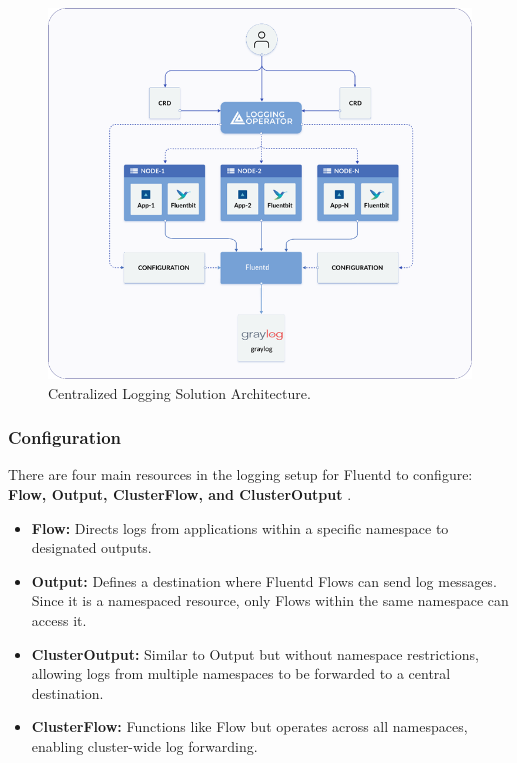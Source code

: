 \documentclass[../main.tex]{subfiles}
\begin{document}
\begin{figure}[H]
        \centering
        \includegraphics[]{img/3-background/centralized_logging/architecture.png}
        \caption{Centralized Logging Solution Architecture. \protect\footnotemark}
        \label{fig:centralized_logging_architecture}
\end{figure}


\subsubsection{Configuration}

There are four main resources in the logging setup for Fluentd to configure: \textbf{Flow, Output, ClusterFlow, and ClusterOutput} \cite{logconfig}.  
\begin{itemize}
    \item \textbf{Flow:} Directs logs from applications within a specific namespace to designated outputs.
    \item \textbf{Output:} Defines a destination where Fluentd Flows can send log messages. Since it is a namespaced resource, only Flows within the same namespace can access it.
    \item \textbf{ClusterOutput:} Similar to Output but without namespace restrictions, allowing logs from multiple namespaces to be forwarded to a central destination.
    \item \textbf{ClusterFlow:} Functions like Flow but operates across all namespaces, enabling cluster-wide log forwarding.
\end{itemize}
\end{document}
